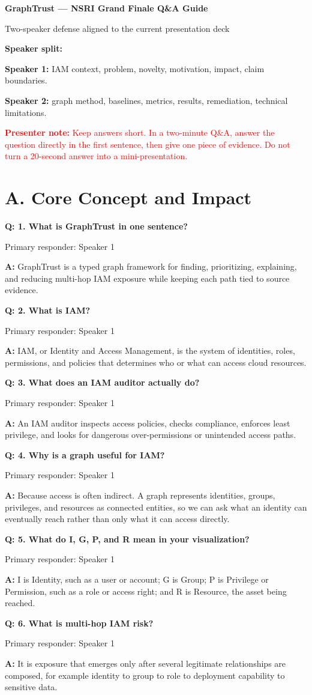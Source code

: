 \documentclass[11pt,a4paper]{article}
\newcommand{\q}[1]{\vspace{0.35em}\textbf{Q: #1}\par}
\newcommand{\a}[1]{\textbf{A:} #1\par}
\newcommand{\owner}[1]{\textcolor{Muted}{\small Primary responder: #1}\par}
\newcommand{\danger}[1]{\textcolor{Red}{\textbf{Presenter note:} #1}\par}
\begin{document}
{\LARGE\bfseries\color{Ink} GraphTrust --- NSRI Grand Finale Q\&A Guide}\par
{\large\color{Muted}Two-speaker defense aligned to the current presentation deck}\par
\vspace{0.25cm}

\textbf{Speaker split:}\par
\textbf{Speaker 1:} IAM context, problem, novelty, motivation, impact, claim boundaries.\par
\textbf{Speaker 2:} graph method, baselines, metrics, results, remediation, technical limitations.

\danger{Keep answers short. In a two-minute Q\&A, answer the question directly in the first sentence, then give one piece of evidence. Do not turn a 20-second answer into a mini-presentation.}

\section*{A. Core Concept and Impact}

\q{1. What is GraphTrust in one sentence?}
\owner{Speaker 1}
\a{GraphTrust is a typed graph framework for finding, prioritizing, explaining, and reducing multi-hop IAM exposure while keeping each path tied to source evidence.}

\q{2. What is IAM?}
\owner{Speaker 1}
\a{IAM, or Identity and Access Management, is the system of identities, roles, permissions, and policies that determines who or what can access cloud resources.}

\q{3. What does an IAM auditor actually do?}
\owner{Speaker 1}
\a{An IAM auditor inspects access policies, checks compliance, enforces least privilege, and looks for dangerous over-permissions or unintended access paths.}

\q{4. Why is a graph useful for IAM?}
\owner{Speaker 1}
\a{Because access is often indirect. A graph represents identities, groups, privileges, and resources as connected entities, so we can ask what an identity can eventually reach rather than only what it can access directly.}

\q{5. What do I, G, P, and R mean in your visualization?}
\owner{Speaker 1}
\a{I is Identity, such as a user or account; G is Group; P is Privilege or Permission, such as a role or access right; and R is Resource, the asset being reached.}

\q{6. What is multi-hop IAM risk?}
\owner{Speaker 1}
\a{It is exposure that emerges only after several legitimate relationships are composed, for example identity to group to role to deployment capability to sensitive data.}
\end{document}
